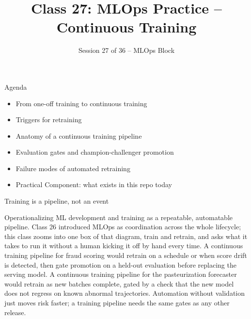 

\title{Class 27: MLOps Practice -- Continuous Training}
\subtitle{Session 27 of 36 -- MLOps Block}
\author{\coursename}
\date{}



\frame{\titlepage \coursefooter}

\begin{frame}{Agenda}
\begin{itemize}
\item From one-off training to continuous training
\item Triggers for retraining
\item Anatomy of a continuous training pipeline
\item Evaluation gates and champion-challenger promotion
\item Failure modes of automated retraining
\item Practical Component: what exists in this repo today
\end{itemize}
\coursefooter
\end{frame}

\begin{frame}{Training is a pipeline, not an event}
\coursefooter
\end{frame}

\coursecontextframe
{Operationalizing ML development and training as a repeatable, automatable pipeline.}
{Class 26 introduced MLOps as coordination across the whole lifecycle; this class zooms into one box of that diagram, train and retrain, and asks what it takes to run it without a human kicking it off by hand every time.}
{A continuous training pipeline for fraud scoring would retrain on a schedule or when score drift is detected, then gate promotion on a held-out evaluation before replacing the serving model.}
{A continuous training pipeline for the pasteurization forecaster would retrain as new batches complete, gated by a check that the new model does not regress on known abnormal trajectories.}
{Automation without validation just moves risk faster; a training pipeline needs the same gates as any other release.}

